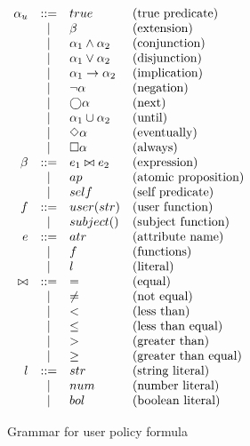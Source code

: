 \begin{table}[!ht]
    \centering
    $
    \begin{array}{rcll}
        \alpha_u   & ::=   & true              & \text{(true predicate)} \\
                & |     & \beta              & \text{(extension)} \\
                & |     & \alpha_1 \land \alpha_2 & \text{(conjunction)} \\
                & |     & \alpha_1 \lor \alpha_2  & \text{(disjunction)} \\
                & |     & \alpha_1 \rightarrow \alpha_2 & \text{(implication)} \\
                & |     & \neg \alpha          & \text{(negation)} \\
                & |     & \bigcirc \alpha            & \text{(next)} \\
                & |     & \alpha_1 \cup \alpha_2    & \text{(until)} \\
                & |     & \Diamond \alpha            & \text{(eventually)} \\
                & |     & \square \alpha            & \text{(always)} \\
        \beta    & ::=   & e_1 \bowtie e_2   & \text{(expression)} \\
                & |     & ap                & \text{(atomic proposition)} \\
                & |     & self              & \text{(self predicate)} \\
        f       & ::=   & user(str)           & \text{(user function)} \\
                & |     & subject()         & \text{(subject function)} \\
        e       & ::=   & atr               & \text{(attribute name)} \\
                & |     & f                 & \text{(functions)} \\
                & |     & l                 & \text{(literal)} \\
        \bowtie & ::=   & =                 & \text{(equal)} \\
                & |     & \neq              & \text{(not equal)} \\
                & |     & <                 & \text{(less than)} \\
                & |     & \leq              & \text{(less than equal)} \\
                & |     & >                 & \text{(greater than)} \\
                & |     & \geq              & \text{(greater than equal)} \\
        l       & ::=   & str               & \text{(string literal)} \\
                & |     & num               & \text{(number literal)} \\
                & |     & bol               & \text{(boolean literal)} \\
    \end{array}
    $
    \caption{Grammar for user policy formula}
    \label{tab:pf-grammar-user}
\end{table}